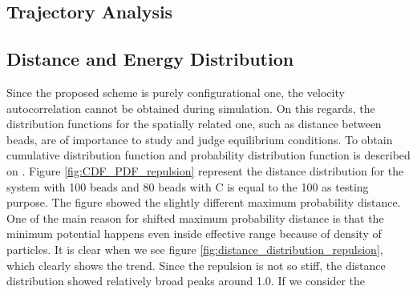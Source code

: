 \message{ !name(brief_Brownian_dynamics.tex)}\documentclass[10pt, a4paper]{report}
\begin{document}
\subsection{Trajectory Analysis}

\subsection{Distance and Energy Distribution}
Since the proposed scheme is purely configurational one, the velocity autocorrelation cannot be obtained during simulation. On this regards, the distribution functions for the spatially related one, such as distance between beads, are of importance to study and judge equilibrium conditions. To obtain cumulative distribution function and probability distribution function is described on \label{appen_distance_distribution}.
Figure \ref{fig:CDF_PDF_repulsion} represent the distance distribution for the system with 100 beads and 80 beads with C is equal to the 100 as testing purpose.
The figure showed the slightly different maximum probability distance. One of the main reason for shifted maximum probability distance is that the minimum potential happens even inside effective range because of density of particles. It is clear when we see figure \ref{fig:distance_distribution_repulsion}, which clearly shows the trend.
Since the repulsion is not so stiff, the distance distribution showed relatively broad peaks around 1.0. If we consider the 
\end{document}
